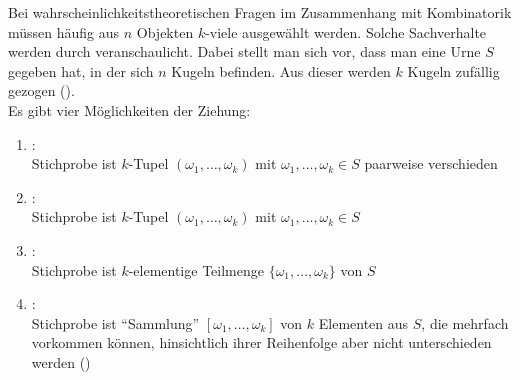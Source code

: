 \linie
\pagebreak

\begin{Bem}
    Bei wahrscheinlichkeitstheoretischen Fragen im Zusammenhang mit Kombinatorik müssen häufig
    aus $n$ Objekten $k$-viele ausgewählt werden.
    Solche Sachverhalte werden durch  veranschaulicht.
    Dabei stellt man sich vor, dass man eine Urne $S$ gegeben hat, in der sich $n$ Kugeln befinden.
    Aus dieser werden $k$ Kugeln zufällig gezogen ().\\
    Es gibt vier Möglichkeiten der Ziehung:
    \begin{enumerate}
        \item
        :\\
        Stichprobe ist $k$-Tupel $(\omega_1, \dotsc, \omega_k)$ mit
        $\omega_1, \dotsc, \omega_k \in S$ paarweise verschieden

        \item
        :\\
        Stichprobe ist $k$-Tupel $(\omega_1, \dotsc, \omega_k)$ mit
        $\omega_1, \dotsc, \omega_k \in S$

        \item
        :\\
        Stichprobe ist $k$-elementige Teilmenge $\{\omega_1, \dotsc, \omega_k\}$ von $S$

        \item
        :\\
        Stichprobe ist "`Sammlung"' $[\omega_1, \dotsc, \omega_k]$ von $k$ Elementen aus $S$,
        die mehrfach vorkommen können, hinsichtlich ihrer Reihenfolge aber nicht unterschieden
        werden ()
    \end{enumerate}
\end{Bem}

